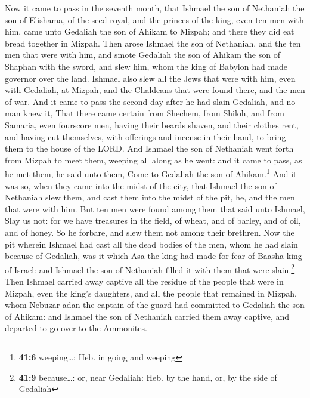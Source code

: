  Now it came to pass in the seventh month, that Ishmael
the son of Nethaniah the son of Elishama, of the seed royal, and the
princes of the king, even ten men with him, came unto Gedaliah the son
of Ahikam to Mizpah; and there they did eat bread together in Mizpah.
 Then arose Ishmael the son of Nethaniah, and the ten men
that were with him, and smote Gedaliah the son of Ahikam the son of
Shaphan with the sword, and slew him, whom the king of Babylon had made
governor over the land.  Ishmael also slew all the Jews
that were with him, even with Gedaliah, at Mizpah, and the Chaldeans
that were found there, and the men of war.  And it came to
pass the second day after he had slain Gedaliah, and no man knew it,
 That there came certain from Shechem, from Shiloh, and
from Samaria, even fourscore men, having their beards shaven, and their
clothes rent, and having cut themselves, with offerings and incense in
their hand, to bring them to the house of the LORD.  And
Ishmael the son of Nethaniah went forth from Mizpah to meet them,
weeping all along as he went: and it came to pass, as he met them, he
said unto them, Come to Gedaliah the son of Ahikam.\footnote{\textbf{41:6}
  weeping\ldots: Heb. in going and weeping}  And it was
so, when they came into the midst of the city, that Ishmael the son of
Nethaniah slew them, and cast them into the midst of the pit, he, and
the men that were with him.  But ten men were found among
them that said unto Ishmael, Slay us not: for we have treasures in the
field, of wheat, and of barley, and of oil, and of honey. So he forbare,
and slew them not among their brethren.  Now the pit
wherein Ishmael had cast all the dead bodies of the men, whom he had
slain because of Gedaliah, was it which Asa the king had made for fear
of Baasha king of Israel: and Ishmael the son of Nethaniah filled it
with them that were slain.\footnote{\textbf{41:9} because\ldots: or,
  near Gedaliah: Heb. by the hand, or, by the side of Gedaliah}
 Then Ishmael carried away captive all the residue of the
people that were in Mizpah, even the king's daughters, and all the
people that remained in Mizpah, whom Nebuzar-adan the captain of the
guard had committed to Gedaliah the son of Ahikam: and Ishmael the son
of Nethaniah carried them away captive, and departed to go over to the
Ammonites.

